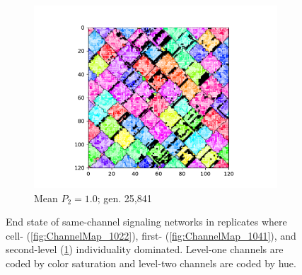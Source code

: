 \begin{figure}[!htbp]
\begin{center}
\begin{subfigure}[b]{0.80\columnwidth}
  \includegraphics[width=\columnwidth,trim={2.5cm 0.5cm 2.5cm 1cm},clip]{img/ChannelMap_1008_update19500000}
  \caption{Mean $P_2 = 1.0$; gen. 25,841}
  \label{fig:ChannelMap_1008}
\end{subfigure}

\caption{
End state of same-channel signaling networks in replicates where cell- (\ref{fig:ChannelMap_1022}), first- (\ref{fig:ChannelMap_1041}), and second-level (\ref{fig:ChannelMap_1008}) individuality dominated.
Level-one channels are coded by color saturation and level-two channels are coded by hue.
}
\label{fig:outcome_grids}
\end{center}
\end{figure}
